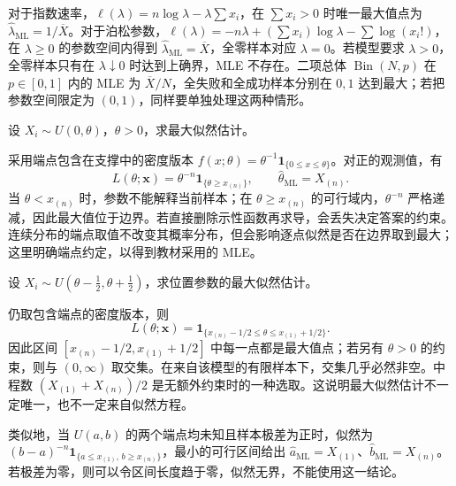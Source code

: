 对于指数速率，$\ell(\lambda)=n\log\lambda-\lambda\sum x_i$，在 $\sum x_i>0$ 时唯一最大值点为 $\widehat\lambda_{\mathrm{ML}}=1/\overline X$。对于泊松参数，$\ell(\lambda)=-n\lambda+(\sum x_i)\log\lambda-\sum\log(x_i!)$，在 $\lambda\ge0$ 的参数空间内得到 $\widehat\lambda_{\mathrm{ML}}=\overline X$，全零样本对应 $\lambda=0$。若模型要求 $\lambda>0$，全零样本只有在 $\lambda\downarrow0$ 时达到上确界，MLE 不存在。二项总体 $\operatorname{Bin}(N,p)$ 在 $p\in[0,1]$ 内的 MLE 为 $\overline X/N$，全失败和全成功样本分别在 $0,1$ 达到最大；若把参数空间限定为 $(0,1)$，同样要单独处理这两种情形。

\begin{example}
\label{ex:study-uniform-mle}
设 $X_i\sim U(0,\theta)$，$\theta>0$，求最大似然估计。
\end{example}

\begin{solve}
采用端点包含在支撑中的密度版本 $f(x;\theta)=\theta^{-1}\mathbf1_{\{0\le x\le\theta\}}$。对正的观测值，有
\begin{equation}
  L(\theta;\boldsymbol x)=\theta^{-n}
      \mathbf1_{\{\theta\ge x_{(n)}\}},
  \qquad
  \widehat\theta_{\mathrm{ML}}=X_{(n)}.
  \label{eq:study-uniform-mle}
\end{equation}
当 $\theta<x_{(n)}$ 时，参数不能解释当前样本；在 $\theta\ge x_{(n)}$ 的可行域内，$\theta^{-n}$ 严格递减，因此最大值位于边界。若直接删除示性函数再求导，会丢失决定答案的约束。连续分布的端点取值不改变其概率分布，但会影响逐点似然是否在边界取到最大；这里明确端点约定，以得到教材采用的 MLE。
\end{solve}

\begin{example}
\label{ex:study-uniform-location-mle}
设 $X_i\sim U(\theta-\tfrac12,\theta+\tfrac12)$，求位置参数的最大似然估计。
\end{example}

\begin{solve}
仍取包含端点的密度版本，则
\[
  L(\theta;\boldsymbol x)
    =\mathbf1_{\{x_{(n)}-1/2\le\theta\le x_{(1)}+1/2\}}.
\]
因此区间 $[x_{(n)}-1/2,x_{(1)}+1/2]$ 中每一点都是最大值点；若另有 $\theta>0$ 的约束，则与 $(0,\infty)$ 取交集。在来自该模型的有限样本下，交集几乎必然非空。中程数 $(X_{(1)}+X_{(n)})/2$ 是无额外约束时的一种选取。这说明最大似然估计不一定唯一，也不一定来自似然方程。
\end{solve}

类似地，当 $U(a,b)$ 的两个端点均未知且样本极差为正时，似然为 $(b-a)^{-n}\mathbf1_{\{a\le x_{(1)},\,b\ge x_{(n)}\}}$，最小的可行区间给出 $\widehat a_{\mathrm{ML}}=X_{(1)}$、$\widehat b_{\mathrm{ML}}=X_{(n)}$。若极差为零，则可以令区间长度趋于零，似然无界，不能使用这一结论。

